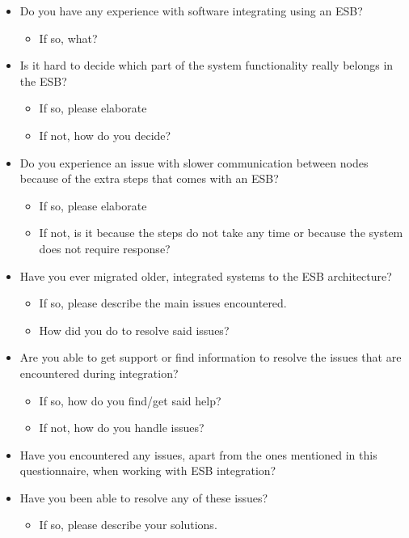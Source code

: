 \documentclass{llncs}
\begin{document}
\begin{itemize}

\item Do you have any experience with software integrating using an ESB?
\begin{itemize}
\item If so, what?
\end{itemize}

\item Is it hard to decide which part of the system functionality really belongs in the ESB?
\begin{itemize}
\item If so, please elaborate
\item If not, how do you decide?
\end{itemize}

\item Do you experience an issue with slower communication between nodes because of the extra steps that comes with an ESB?
\begin{itemize}
\item If so, please elaborate
\item If not, is it because the steps do not take any time or because the system does not require response?
\end{itemize}

\item Have you ever migrated older, integrated systems to the ESB architecture?
\begin{itemize}
\item If so, please describe the main issues encountered.
\item How did you do to resolve said issues?
\end{itemize}

\item Are you able to get support or find information to resolve the issues that are encountered during integration?
\begin{itemize}
\item If so, how do you find/get said help?
\item If not, how do you handle issues?
\end{itemize}

\item Have you encountered any issues, apart from the ones mentioned in this questionnaire, when working with ESB integration?

\item Have you been able to resolve any of these issues?
\begin{itemize}
\item If so, please describe your solutions.
\end{itemize}

\end{itemize}
\end{document}
